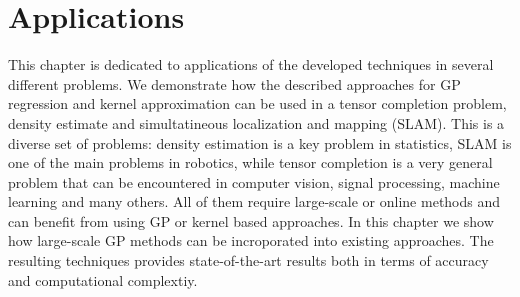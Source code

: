 \chapter{Applications}
\label{chap:applications}

This chapter is dedicated to applications of the developed techniques
in several different problems.
We demonstrate how the described approaches for GP regression
and kernel approximation can be used in a tensor completion
problem,
density estimate and simultatineous localization and mapping (SLAM).
This is a diverse set of problems: density estimation is a key problem
in statistics, SLAM is one of the main problems in robotics,
while tensor completion is a very general problem that can be encountered
in computer vision, signal processing, machine learning and many others.
All of them require large-scale or online methods and can benefit
from using GP or kernel based approaches.
In this chapter we show how large-scale GP methods can be incroporated into
existing approaches.
The resulting techniques provides state-of-the-art results both in terms of
accuracy and computational complextiy.

